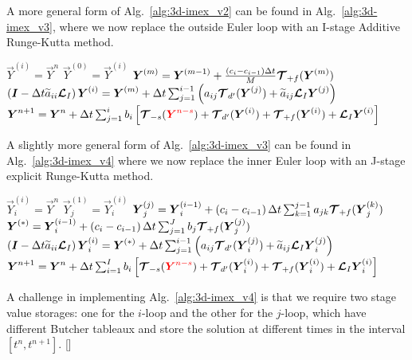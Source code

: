 \documentclass{report}
\numberwithin{equation}{section}
\begin{document}
A more general form of Alg.\ \ref{alg:3d-imex_v2} can be found in Alg.\ \ref{alg:3d-imex_v3}, where we now replace the outside Euler loop with an I-stage Additive Runge-Kutta method. 
\begin{algorithm}
\label{alg:3d-imex_v3}
\begin{algorithmic}
\State
{}
\State $\vec{Y}^{(i)}=\vec{Y}^{n}$
\State $\vec{Y}^{(0)}=\vec{Y}^{(i)}$
\State $\boldsymbol{{Y}}^{(m)}=\boldsymbol{{Y}}^{(m-1)} + \frac{\left(c_i - c_{i-1} \right) \Delta t}{M} \boldsymbol{{\mathcal{T}}}_{+f}(\boldsymbol{{Y}}^{(m)})$
\EndFor %
\State $\left( \boldsymbol{{I}} - \Delta t \widetilde{a}_{ii} \boldsymbol{{\mathcal{L}}}_I \right) \boldsymbol{{Y}}^{(i)}=\boldsymbol{{Y}}^{(m)} + \Delta t \sum_{j=1}^{i-1} \left( a_{ij} \boldsymbol{{\mathcal{T}}}_{d'}(\boldsymbol{{Y}}^{(j)}) + \widetilde{a}_{ij} \boldsymbol{{\mathcal{L}}}_I \boldsymbol{{Y}}^{(j)} \right)$
\EndFor %
\State $\boldsymbol{{Y}}^{n+1}=\boldsymbol{{Y}}^{n} + \Delta t \sum_{j=1}^{i} b_i \left[ \boldsymbol{{\mathcal{T}}}_{-s}(\textcolor{red}{\boldsymbol{{Y}}^{n-s}}) + \boldsymbol{{\mathcal{T}}}_{d'}(\boldsymbol{{Y}}^{(i)}) + 
\boldsymbol{{\mathcal{T}}}_{+f}(\boldsymbol{{Y}}^{(i)}) + 
\boldsymbol{{\mathcal{L}}}_I \boldsymbol{{Y}}^{(i)} \right]$
\EndFunction
\end{algorithmic}
\end{algorithm}

A slightly more general form of Alg.\ \ref{alg:3d-imex_v3} can be found in Alg.\ \ref{alg:3d-imex_v4} where we now replace the inner Euler loop with an J-stage explicit Runge-Kutta method. 
\begin{algorithm}
\label{alg:3d-imex_v4}
\begin{algorithmic}
\State
{}
\State $\vec{Y}_i^{(i)}=\vec{Y}^{n}$
\State $\vec{Y}_j^{(1)}=\vec{Y}_i^{(i)}$
\State $\boldsymbol{{Y}}_j^{(j)}=\boldsymbol{{Y}}_i^{(i-1)} + \left(c_i - c_{i-1} \right) \Delta t \sum_{k=1}^{j-1} a_{jk} \boldsymbol{{\mathcal{T}}}_{+f}(\boldsymbol{{Y}}_j^{(k)})$
\EndFor %
\State $\boldsymbol{{Y}}^{(*)}=\boldsymbol{{Y}}_i^{(i-1)} + \left(c_i - c_{i-1} \right) \Delta t \sum_{j=1}^{J} b_j \boldsymbol{{\mathcal{T}}}_{+f}(\boldsymbol{{Y}}_j^{(j)})$
\State $\left( \boldsymbol{{I}} - \Delta t \widetilde{a}_{ii} \boldsymbol{{\mathcal{L}}}_I \right) \boldsymbol{{Y}}_i^{(i)}=\boldsymbol{{Y}}^{(*)} + \Delta t \sum_{j=1}^{i-1} \left( a_{ij} \boldsymbol{{\mathcal{T}}}_{d'}(\boldsymbol{{Y}}_i^{(j)}) + \widetilde{a}_{ij} \boldsymbol{{\mathcal{L}}}_I \boldsymbol{{Y}}_i^{(j)} \right)$
\EndFor %
\State $\boldsymbol{{Y}}^{n+1}=\boldsymbol{{Y}}^{n} + \Delta t \sum_{i=1}^{I} b_i \left[ \boldsymbol{{\mathcal{T}}}_{-s}(\textcolor{red}{\boldsymbol{{Y}}^{n-s}}) + \boldsymbol{{\mathcal{T}}}_{d'}(\boldsymbol{{Y}}_i^{(i)}) + 
\boldsymbol{{\mathcal{T}}}_{+f}(\boldsymbol{{Y}}_i^{(i)}) + 
\boldsymbol{{\mathcal{L}}}_I \boldsymbol{{Y}}_i^{(i)} \right]$
\EndFunction
\end{algorithmic}
\end{algorithm}
A challenge in implementing Alg.\ \ref{alg:3d-imex_v4} is that we require two stage value storages: one for the $i$-loop and the other for the $j$-loop, which have different Butcher tableaux and store the solution at different times in the interval $[t^n,t^{n+1}]$.
[]
\end{document}
